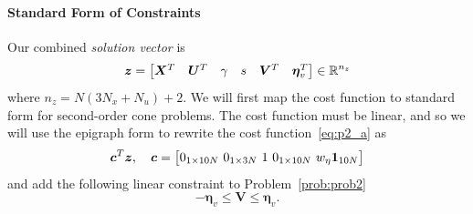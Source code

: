 \documentclass[10pt]{article}
\begin{document}

\paragraph{Standard Form of Constraints}

Our combined \textit{solution vector} is 
\begin{equation*}
\bm{z} = \begin{bmatrix}
\bm{X}^T & \bm{U}^T & \gamma & s & \bm{V}^T & \bm{\eta}_v^T
\end{bmatrix} \in {\mathbb{R}}^{n_z}
\end{equation*}
where $n_z = N(3N_x + N_u)+2$. We will first map the cost function to standard form for second-order cone problems. The cost function must be linear, and so we will use the epigraph form to rewrite the cost function~\eqref{eq:p2_a} as
\begin{equation}
\bm{c}^T \bm{z}, \quad \bm{c} = \big[ 0_{1 \times 10N} \ 0_{1 \times 3N} \ 1 \ 0_{1 \times 10N} \ w_{\eta} \bm{1}_{10N} \big]
\label{eq:std_cost}
\end{equation}
and add the following linear constraint to Problem~\ref{prob:prob2}
\begin{equation}
- \bm{\eta}_v \leq \bm{V} \leq \bm{\eta}_v.
\label{eq:p2_epi}
\end{equation}
\end{document}
